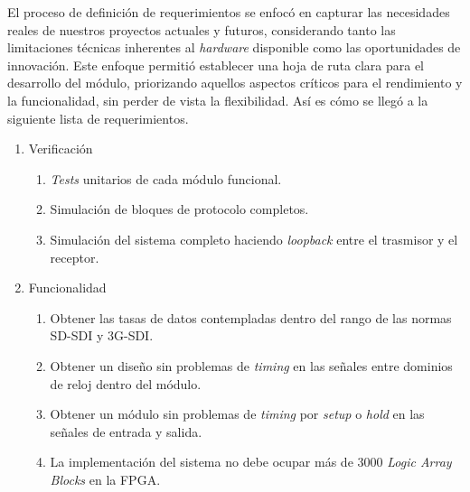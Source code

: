   El proceso de definición de requerimientos se enfocó en capturar las
  necesidades reales de nuestros proyectos actuales y futuros, considerando tanto
  las limitaciones técnicas inherentes al \textit{hardware} disponible como las
  oportunidades de innovación. Este enfoque permitió establecer una hoja de ruta
  clara para el desarrollo del módulo, priorizando aquellos aspectos críticos
  para el rendimiento y la funcionalidad, sin perder de vista la flexibilidad.
  Así es cómo se llegó a la siguiente lista de requerimientos.

  \begin{enumerate}
      \item Verificación
      \begin{enumerate}
          \item \textit{Tests} unitarios de cada módulo funcional.
          \item Simulación de bloques de protocolo completos.
          \item Simulación del sistema completo haciendo \textit{loopback} entre el trasmisor y el receptor.
      \end{enumerate}
      \item Funcionalidad
      \begin{enumerate}
          \item Obtener las tasas de datos contempladas dentro del rango de las normas SD-SDI y 3G-SDI\@.
          \item Obtener un diseño sin problemas de \textit{timing} en las señales entre dominios de reloj
          dentro del módulo.
          \item Obtener un módulo sin problemas de \textit{timing} por \textit{setup} o \textit{hold} en las señales de entrada y salida.
          \item La implementación del sistema no debe ocupar más de 3000 \textit{Logic Array Blocks} en la FPGA\@.
      \end{enumerate}

\end{enumerate}
